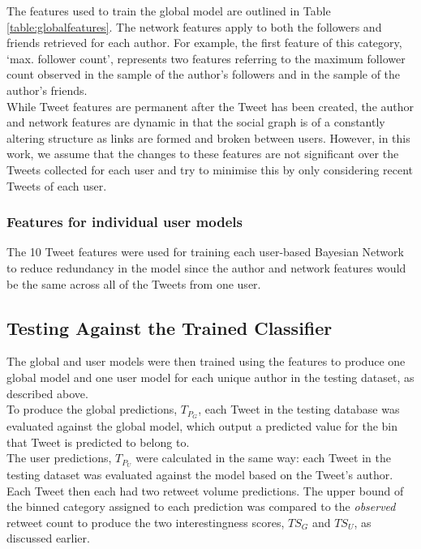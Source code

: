 \begin{enumerate}
The features used to train the global model are outlined in Table \ref{table:globalfeatures}. The network features apply to both the followers and friends retrieved for each author. For example, the first feature of this category, `max. follower count', represents two features referring to the maximum follower count observed in the sample of the author's followers and in the sample of the author's friends. \\
While Tweet features are permanent after the Tweet has been created, the author and network features are dynamic in that the social graph is of a constantly altering structure as links are formed and broken between users. However, in this work, we assume that the changes to these features are not significant over the Tweets collected for each user and try to minimise this by only considering recent Tweets of each user.

\subsubsection{Features for individual user models} 
The 10 Tweet features were used for training each user-based Bayesian Network to reduce redundancy in the model since the author and network features would be the same across all of the Tweets from one user.



\subsection{Testing Against the Trained Classifier}
The global and user models were then trained using the features to produce one global model and one user model for each unique author in the testing dataset, as described above.\\
To produce the global predictions, $ T_{P_G} $, each Tweet in the testing database was evaluated against the global model, which output a predicted value for the bin that Tweet is predicted to belong to.\\
The user predictions, $ T_{P_U} $ were calculated in the same way: each Tweet in the testing dataset was evaluated against the model based on the Tweet's author.\\
Each Tweet then each had two retweet volume predictions. The upper bound of the binned category assigned to each prediction was compared to the \textit{observed} retweet count to produce the two interestingness scores, $ TS_G $ and $ TS_U $, as discussed earlier.



\end{enumerate}
